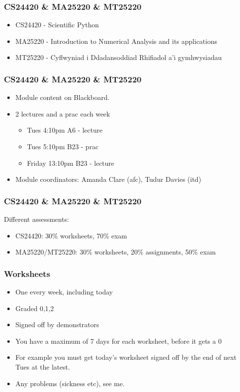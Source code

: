 \documentclass{beamer}
\begin{document}
\begin{frame}
\frametitle{CS24420 \& MA25220 \& MT25220}
\begin{itemize}
\item CS24420 - Scientific Python
\item MA25220 - Introduction to Numerical Analysis and its
  applications
\item MT25220 - Cyflwyniad i Ddadansoddiad Rhifiadol a'i gymhwysiadau
\end{itemize}
\end{frame}

\begin{frame}
\frametitle{CS24420 \& MA25220 \& MT25220}
\begin{itemize}
\item Module content on Blackboard.
\item 2 lectures and a prac each week
\begin{itemize}
\item Tues 4:10pm A6 - lecture
\item Tues 5:10pm B23 - prac
\item Friday 13:10pm B23 - lecture 
\end{itemize}
\item Module coordinators: Amanda Clare (afc), Tudur Davies (itd)
\end{itemize}
\end{frame}

\begin{frame}
\frametitle{CS24420 \& MA25220 \& MT25220}
Different assessments:
\begin{itemize}
\item CS24420: 30\% worksheets, 70\% exam
\item MA25220/MT25220: 30\% worksheets, 20\% assignments, 50\% exam
\end{itemize}
\end{frame}

\begin{frame}
\frametitle{Worksheets}
\begin{itemize}
\item One every week, including today
\item Graded 0,1,2
\item Signed off by demonstrators
\item You have a maximum of 7 days for each worksheet, before it gets a 0
\item For example you must get today's worksheet signed off by the end
  of next Tues at the latest.
\item Any problems (sickness etc), see me.
\end{itemize}
\end{frame}
\end{document}
